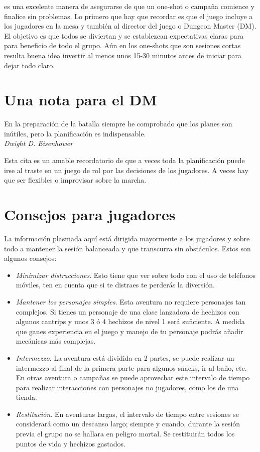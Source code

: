 \documentclass[10pt,twoside,twocolumn,openany]{dndbook}
\begin{document}
 es una excelente manera de asegurarse de que un one-shot o campaña comience y 
finalice sin problemas. Lo primero que hay que recordar es que el juego incluye a los jugadores 
en la mesa y también al director del juego o Dungeon Master (DM). El objetivo es que todos se 
diviertan y se establezcan expectativas claras para para beneficio de todo el grupo. Aún en los 
one-shots que son sesiones cortas resulta buena idea invertir al menos unos 15-30 minutos antes de 
iniciar para dejar todo claro.

\section*{Una nota para el DM}

\begin{DndReadAloud}
  En la preparación de la batalla siempre he comprobado que los planes son inútiles, pero la 
  planificación es indispensable. \\
  \emph{Dwight D. Eisenhower}
\end{DndReadAloud}

Esta cita es un amable recordatorio de que a veces toda la planificación puede irse al traste 
en un juego de rol por las decisiones de los jugadores. A veces hay que ser flexibles o improvisar 
sobre la marcha.

\section*{Consejos para jugadores}

La información plasmada aquí está dirigida mayormente a los jugadores y sobre todo a mantener la 
sesión balanceada y que transcurra sin obstáculos. Estos son algunos consejos:

\begin{itemize}
  \item \emph{Minimizar distracciones}. Esto tiene que ver sobre todo con el uso de teléfonos 
  móviles, ten en cuenta que si te distraes te perderás la diversión.
  \item \emph{Mantener los personajes simples}. Esta aventura no requiere personajes tan complejos.
  Si tienes un personaje de una clase lanzadora de hechizos con algunos cantrips y unos 3 ó 4 
  hechizos de nivel 1 será suficiente. A medida que ganes experiencia en el juego y manejo de tu 
  personaje podrás añadir mecánicas más complejas.
  \item \emph{Intermezzo}. La aventura está dividida en 2 partes, se puede realizar un intermezzo 
  al final de la primera parte para algunos snacks, ir al baño, etc. En otras aventura o campañas
  se puede aprovechar este intervalo de tiempo para realizar interacciones con personajes no 
  jugadores, como los de una tienda.
  \item \emph{Restitución}. En aventuras largas, el intervalo de tiempo entre sesiones se 
  considerará como un descanso largo; siempre y cuando, durante la sesión previa el grupo no se 
  hallara en peligro mortal. Se restituirán todos los puntos de vida y hechizos gastados.
\end{itemize}
\end{document}
